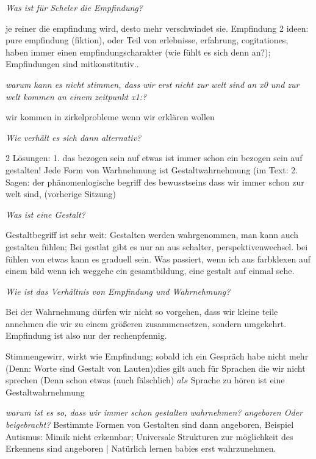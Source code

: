 \documentclass[a4paper, emulatestandardclasses]{scrartcl}
\begin{document}
\noindent \emph{Was ist für Scheler die Empfindung?}

je reiner die empfindung wird, desto mehr verschwindet sie. Empfindung 2 ideen: pure empfindung (fiktion), oder Teil von erlebnisse, erfahrung, cogitationes, haben immer einen empfindungscharakter (wie fühlt es sich denn an?); Empfindungen sind mitkonstitutiv..\newline


\noindent \emph{warum kann es nicht stimmen, dass wir erst nicht zur welt sind an x0 und zur welt kommen an einem zeitpunkt x1:?}

wir kommen in zirkelprobleme wenn wir erklären wollen\newline

\noindent \emph{Wie verhält es sich dann alternativ?} 

2 Lösungen: 1. das bezogen sein auf etwas ist immer schon ein bezogen sein auf gestalten! Jede Form von Warhnehmung ist Gestaltwahrnehmung (im Text: 2. Sagen: der phänomenlogische begriff des bewusstseins dass wir immer schon zur welt sind, (vorherige Sitzung)\newline

\noindent \emph{Was ist eine Gestalt?}

Gestaltbegriff ist sehr weit: Gestalten werden wahrgenommen, man kann auch gestalten fühlen; Bei gestlat gibt es nur an aus schalter, perspektivenwechsel. bei fühlen von etwas kann es graduell sein. Was passiert, wenn ich aus farbklexen auf einem bild wenn ich weggehe ein gesamtbildung, eine gestalt auf einmal sehe.\newline

\noindent \emph{Wie ist das Verhältnis von Empfindung und Wahrnehmung?}

Bei der Wahrnehmung dürfen wir nicht so vorgehen, dass wir kleine teile annehmen die wir zu einem größeren zusammensetzen, sondern umgekehrt. Empfindung ist also nur der rechenpfennig.

Stimmengewirr, wirkt wie Empfindung; sobald ich ein Gespräch habe nicht mehr (Denn: Worte sind Gestalt von Lauten);dies gilt auch für Sprachen die wir nicht sprechen (Denn schon etwas (auch fälschlich) $als$ Sprache zu hören ist eine Gestaltwahrnehmung

\noindent \emph{warum ist es so, dass wir immer schon gestalten wahrnehmen? angeboren Oder beigebracht?}
Bestimmte Formen von Gestalten sind dann angeboren, Beispiel Autismus: Mimik nicht erkennbar; Universale Strukturen zur möglichkeit des Erkennens sind angeboren | Natürlich lernen babies erst wahrzunehmen.
\end{document}
